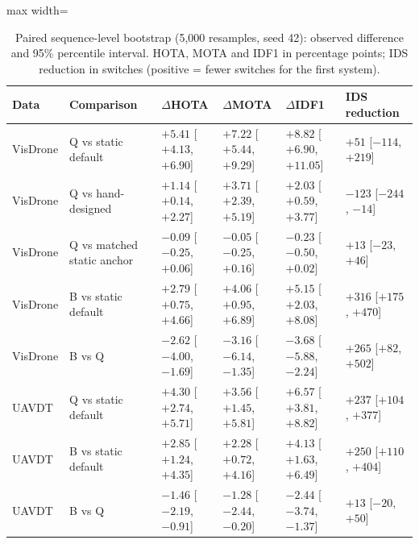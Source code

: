 \begin{table}
\centering
\caption{Paired sequence-level bootstrap (5,000 resamples, seed 42): observed difference and 95\% percentile interval. HOTA, MOTA and IDF1 in percentage points; IDS reduction in switches (positive = fewer switches for the first system).}
\label{tab:ch4-boot}
\small\setlength{\tabcolsep}{4pt}
\begin{adjustbox}{max width=\textheight}
\begin{tabular}{llllll}
\hline
Data & Comparison & $\Delta$HOTA & $\Delta$MOTA & $\Delta$IDF1 & IDS reduction \\
\hline
VisDrone & Q vs static default & $+5.41$ [$+4.13$, $+6.90$] & $+7.22$ [$+5.44$, $+9.29$] & $+8.82$ [$+6.90$, $+11.05$] & $+51$ [$-114$, $+219$] \\
VisDrone & Q vs hand-designed & $+1.14$ [$+0.14$, $+2.27$] & $+3.71$ [$+2.39$, $+5.19$] & $+2.03$ [$+0.59$, $+3.77$] & $-123$ [$-244$, $-14$] \\
VisDrone & Q vs matched static anchor & $-0.09$ [$-0.25$, $+0.06$] & $-0.05$ [$-0.25$, $+0.16$] & $-0.23$ [$-0.50$, $+0.02$] & $+13$ [$-23$, $+46$] \\
VisDrone & B vs static default & $+2.79$ [$+0.75$, $+4.66$] & $+4.06$ [$+0.95$, $+6.89$] & $+5.15$ [$+2.03$, $+8.08$] & $+316$ [$+175$, $+470$] \\
VisDrone & B vs Q & $-2.62$ [$-4.00$, $-1.69$] & $-3.16$ [$-6.14$, $-1.35$] & $-3.68$ [$-5.88$, $-2.24$] & $+265$ [$+82$, $+502$] \\
UAVDT & Q vs static default & $+4.30$ [$+2.74$, $+5.71$] & $+3.56$ [$+1.45$, $+5.81$] & $+6.57$ [$+3.81$, $+8.82$] & $+237$ [$+104$, $+377$] \\
UAVDT & B vs static default & $+2.85$ [$+1.24$, $+4.35$] & $+2.28$ [$+0.72$, $+4.16$] & $+4.13$ [$+1.63$, $+6.49$] & $+250$ [$+110$, $+404$] \\
UAVDT & B vs Q & $-1.46$ [$-2.19$, $-0.91$] & $-1.28$ [$-2.44$, $-0.20$] & $-2.44$ [$-3.74$, $-1.37$] & $+13$ [$-20$, $+50$] \\
\hline
\end{tabular}
\end{adjustbox}
\end{table}
